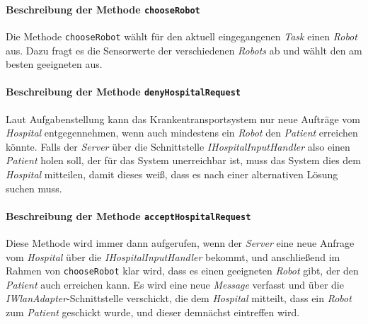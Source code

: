			\paragraph{Beschreibung der Methode \texttt{chooseRobot}}
			Die Methode \texttt{chooseRobot} wählt für den aktuell eingegangenen \emph{Task} einen \emph{Robot} aus. Dazu fragt es die Sensorwerte der verschiedenen \emph{Robots} ab und wählt den am besten geeigneten aus.
			
			\paragraph{Beschreibung der Methode \texttt{denyHospitalRequest}}
			Laut Aufgabenstellung kann das Krankentransportsystem nur neue Aufträge vom \textit{Hospital} entgegennehmen, wenn auch mindestens ein \textit{Robot} den \textit{Patient} erreichen könnte. Falls der \textit{Server} über die Schnittstelle \textit{IHospitalInputHandler} also einen \textit{Patient} holen soll, der für das System unerreichbar ist, muss das System dies dem \textit{Hospital} mitteilen, damit dieses weiß, dass es nach einer alternativen Lösung suchen muss.
			
			
			\paragraph{Beschreibung der Methode \texttt{acceptHospitalRequest}}
			Diese Methode wird immer dann aufgerufen, wenn der \textit{Server} eine neue Anfrage vom \textit{Hospital} über die \textit{IHospitalInputHandler} bekommt, und anschließend im Rahmen von \texttt{chooseRobot} klar wird, dass es einen geeigneten \textit{Robot} gibt, der den \textit{Patient} auch erreichen kann. Es wird eine neue \textit{Message} verfasst und über die \textit{IWlanAdapter}-Schnittstelle verschickt, die dem \textit{Hospital} mitteilt, dass ein \textit{Robot} zum \textit{Patient} geschickt wurde, und dieser demnächst eintreffen wird.
